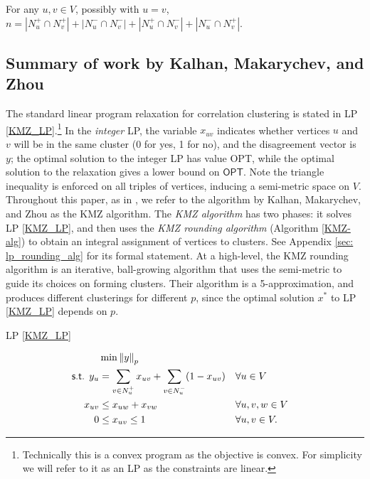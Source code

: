\begin{fact} \label{pairwise_intersections}
For any $u,v \in V$, possibly with $u=v$, $n = |N_u^+ \cap N_v^+| + |N_u^- \cap N_v^-| + |N_u^+ \cap N_v^-| + |N_u^- \cap N_v^+|.$
\end{fact}





\subsection{Summary of work by Kalhan, Makarychev, and Zhou}
The standard linear program relaxation for correlation clustering 
is stated in LP \ref{KMZ_LP}.\footnote{Technically this is a convex program as the objective is convex. For simplicity we will refer to it as an LP as the constraints are linear.}
In the \textit{integer} LP, the variable $x_{uv}$ indicates whether vertices $u$ and $v$ will be in the same cluster (0 for yes, 1 for no), and the disagreement vector is $y$; the optimal solution to the integer LP has value \textsf{OPT}, while the optimal solution to the relaxation gives a lower bound on $\textsf{OPT}$. 
Note the triangle inequality is enforced on all triples of vertices, inducing a semi-metric space on $V$.
Throughout this paper, as in \cite{DMN23}, we refer to the algorithm by Kalhan, Makarychev, and Zhou as the KMZ algorithm. 
The \emph{KMZ algorithm} has two phases: it solves LP \ref{KMZ_LP}, 
and then uses the \textit{KMZ rounding algorithm} (Algorithm \ref{KMZ-alg}) to obtain an integral assignment of vertices to clusters. 
See Appendix \ref{sec: lp_rounding_alg} for its formal statement.
At a high-level, the KMZ rounding algorithm is an iterative, ball-growing algorithm
that uses the semi-metric to guide its choices on forming clusters.
Their algorithm is a 5-approximation, and produces different clusterings for different $p$, since the optimal solution $x^*$ to LP \ref{KMZ_LP} depends on $p$.



\vspace{-1cm}
\begin{flushleft}
\begin{equation*}\label{KMZ_LP}
\end{equation*}
LP \ref{KMZ_LP}
\end{flushleft}
\vspace{-1cm}
\begin{align}
     &\min {\lVert y \rVert}_p \notag\\
    \textsf{s.t. } y_u &= \sum_{v \in N_u^+} x_{uv} + \sum_{v \in N_u^-} (1-x_{uv})  && \forall u \in V \notag\\
     x_{uv}&\leq x_{uw}+x_{vw}  &&\forall u,v,w \in V \notag\\
     0 &\leq x_{uv} \leq 1  &&\forall u,v \in V. \notag
\end{align}

